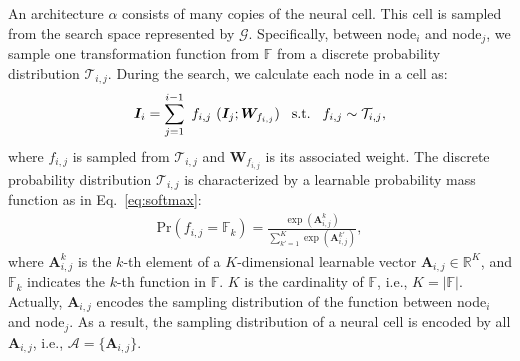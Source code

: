 \documentclass[10pt,twocolumn,letterpaper]{article}
\def\Eqref#1{Eq.~\eqref{#1}}
\def\mA{{\bm{A}}}
\def\mI{{\bm{I}}}
\def\mW{{\bm{W}}}
\def\gA{{\mathcal{A}}}
\def\gG{{\mathcal{G}}}
\def\gT{{\mathcal{T}}}
\def\sF{{\mathbb{F}}}
\def\sR{{\mathbb{R}}}
\begin{document}
An architecture $\alpha$ consists of many copies of the neural cell.
This cell is sampled from the search space represented by $\gG$.
Specifically, between node$_{i}$ and node$_{j}$, we sample one transformation function from $\sF$ from a discrete probability distribution $\gT_{i,j}$.
During the search, we calculate each node in a cell as:
\begin{align}\label{eq:sample}
\mI_{i} = \sum_{j=1}^{i-1} ~f_{i,j}~ ( \mI_{j}; \mW_{f_{i,j}} )  \hspace{0.3cm} \mathrm{s.t.} \hspace{0.3cm} f_{i,j} \sim \gT_{i,j},
\end{align}
\noindent where $f_{i,j}$ is sampled from $\gT_{i,j}$ and $\mW_{f_{i,j}}$ is its associated weight.
The discrete probability distribution $\gT_{i,j}$ is characterized by a learnable probability mass function as in \Eqref{eq:softmax}:
\begin{align}\label{eq:softmax}
    \mathrm{Pr}(f_{i,j}=\sF_{k}) = \frac{\exp(\mA_{i,j}^{k})}{\sum_{k'=1}^{K} \exp(\mA_{i,j}^{k'})} ,
\end{align}
\noindent where $\mA_{i,j}^{k}$ is the $k$-th element of a $K$-dimensional learnable vector $\mA_{i,j} \in \sR^{K}$, and $\sF_{k}$ indicates the $k$-th function in $\sF$.
$K$ is the cardinality of $\sF$, i.e., $K=|\sF|$.
Actually, $\mA_{i,j}$ encodes the sampling distribution of the function between node$_{i}$ and node$_{j}$.
As a result, the sampling distribution of a neural cell is encoded by all $\mA_{i,j}$, i.e., $\gA = \{\mA_{i,j}\}$.
\end{document}
